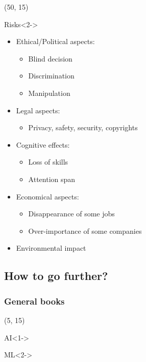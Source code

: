 \begin{frame}
  \begin{textblock}{45}(50, 15)
    \begin{block}{Risks}<2->
      \begin{itemize}
      \item Ethical/Political aspects:
        \begin{itemize}
        \item Blind decision
        \item Discrimination
        \item Manipulation
        \end{itemize}
      \item Legal aspects:
        \begin{itemize}
        \item Privacy, safety, security, copyrights
        \end{itemize}
      \item Cognitive effects:
        \begin{itemize}
        \item Loss of skills
        \item Attention span
        \end{itemize}
      \item Economical aspects:
        \begin{itemize}
        \item Disappearance of some jobs
        \item Over-importance of some companies
        \end{itemize}
      \item Environmental impact
      \end{itemize}
    \end{block}
  \end{textblock}
\end{frame}


\subsection{How to go further?}

\begin{frame}
  \frametitle{General books}

  \nocite{*}

  \begin{textblock}{90}(5, 15)
    \begin{block}{AI}<1->
      \printbibliography[heading=none,category=AI]
    \end{block}

    \begin{block}{\ac{ML}}<2->
      \printbibliography[heading=none,category=ML]
    \end{block}
  \end{textblock}
\end{frame}

